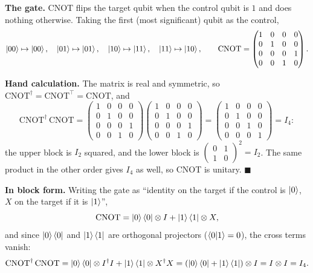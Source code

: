 \documentclass[a4paper, 10pt]{article}
\begin{document}
\begin{solution}
	\noindent \textbf{The gate.} CNOT flips the target qubit when the control qubit is \( 1 \) and does nothing otherwise. Taking the first (most significant) qubit as the control,
	\[
		\ket{00} \mapsto \ket{00}, \quad
		\ket{01} \mapsto \ket{01}, \quad
		\ket{10} \mapsto \ket{11}, \quad
		\ket{11} \mapsto \ket{10},
		\qquad
		\mathrm{CNOT} = \begin{pmatrix}
			1 & 0 & 0 & 0 \\
			0 & 1 & 0 & 0 \\
			0 & 0 & 0 & 1 \\
			0 & 0 & 1 & 0
		\end{pmatrix}.
	\]

	\noindent \textbf{Hand calculation.} The matrix is real and symmetric, so \( \mathrm{CNOT}^{\dagger} = \mathrm{CNOT}^{\top} = \mathrm{CNOT} \), and
	\[
		\mathrm{CNOT}^{\dagger}\,\mathrm{CNOT}
		= \begin{pmatrix}
			1 & 0 & 0 & 0 \\ 0 & 1 & 0 & 0 \\ 0 & 0 & 0 & 1 \\ 0 & 0 & 1 & 0
		\end{pmatrix}
		\begin{pmatrix}
			1 & 0 & 0 & 0 \\ 0 & 1 & 0 & 0 \\ 0 & 0 & 0 & 1 \\ 0 & 0 & 1 & 0
		\end{pmatrix}
		= \begin{pmatrix}
			1 & 0 & 0 & 0 \\ 0 & 1 & 0 & 0 \\ 0 & 0 & 1 & 0 \\ 0 & 0 & 0 & 1
		\end{pmatrix}
		= I_4 :
	\]
	the upper block is \( I_2 \) squared, and the lower block is \( \begin{pmatrix} 0 & 1 \\ 1 & 0 \end{pmatrix}^2 = I_2 \).
	The same product in the other order gives \( I_4 \) as well, so CNOT is unitary. \( \blacksquare \)

	\noindent \textbf{In block form.} Writing the gate as ``identity on the target if the control is \( \ket{0} \), \( X \) on the target if it is \( \ket{1} \)'',
	\[
		\mathrm{CNOT} = \ket{0}\bra{0} \otimes I + \ket{1}\bra{1} \otimes X,
	\]
	and since \( \ket{0}\bra{0} \) and \( \ket{1}\bra{1} \) are orthogonal projectors (\( \braket{0 \vert 1} = 0 \)), the cross terms vanish:
	\[
		\mathrm{CNOT}^{\dagger}\,\mathrm{CNOT}
		= \ket{0}\bra{0} \otimes I^{\dagger}I + \ket{1}\bra{1} \otimes X^{\dagger}X
		= \left( \ket{0}\bra{0} + \ket{1}\bra{1} \right) \otimes I
		= I \otimes I = I_4 .
	\]


\end{solution}
\end{document}
